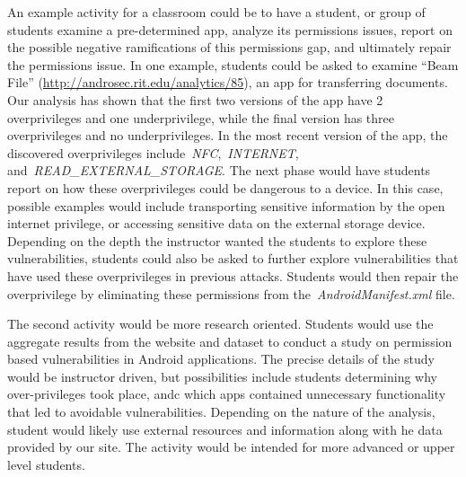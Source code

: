 \documentclass[journal,transmag]{IEEEtran}
\begin{document}
An example activity for a classroom could be to have a student, or group of students examine a pre-determined app, analyze its permissions issues, report on the possible negative ramifications of this permissions gap, and ultimately repair the permissions issue. In one example, students could be asked to examine ``Beam File'' (\url{http://androsec.rit.edu/analytics/85}), an app for transferring documents. Our analysis has shown that the first two versions of the app have 2 overprivileges and one underprivilege, while the final version has three overprivileges and no underprivileges. In the most recent version of the app, the discovered overprivileges include~\emph{NFC},~\emph{INTERNET}, and~\emph{READ\_EXTERNAL\_STORAGE}. The next phase would have students report on how these overprivileges could be dangerous to a device. In this case, possible examples would include transporting sensitive information by the open internet privilege, or accessing sensitive data on the external storage device. Depending on the depth the instructor wanted the students to explore these vulnerabilities, students could also be asked to further explore vulnerabilities that have used these overprivileges in previous attacks. Students would then repair the overprivilege by eliminating these permissions from the~\emph{AndroidManifest.xml} file.


The second activity would be more research oriented. Students would use the aggregate results from the website and dataset to conduct a study on permission based vulnerabilities in Android applications. The precise details of the study would be instructor driven, but possibilities include students determining why over-privileges took place, andc which apps contained unnecessary functionality that led to avoidable vulnerabilities. Depending on the nature of the analysis, student would likely use external resources and information along with he data provided by our site. The activity would be intended for more advanced or upper level students.










\end{document}
